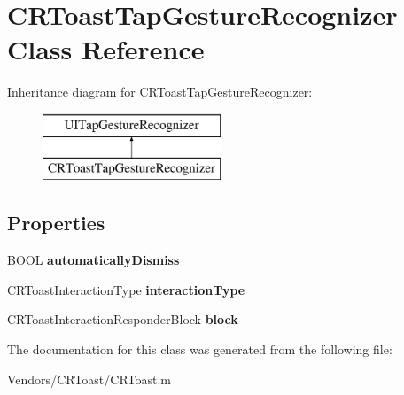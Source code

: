 \hypertarget{interface_c_r_toast_tap_gesture_recognizer}{}\section{C\+R\+Toast\+Tap\+Gesture\+Recognizer Class Reference}
\label{interface_c_r_toast_tap_gesture_recognizer}
Inheritance diagram for C\+R\+Toast\+Tap\+Gesture\+Recognizer\+:\begin{figure}[H]
\begin{center}
\leavevmode
\includegraphics[height=2.000000cm]{interface_c_r_toast_tap_gesture_recognizer}
\end{center}
\end{figure}
\subsection*{Properties}
\begin{DoxyCompactItemize}
\item 
\hypertarget{interface_c_r_toast_tap_gesture_recognizer_afbacb646c8b45529dfe359044ee67fc6}{}B\+O\+O\+L {\bfseries automatically\+Dismiss}\label{interface_c_r_toast_tap_gesture_recognizer_afbacb646c8b45529dfe359044ee67fc6}

\item 
\hypertarget{interface_c_r_toast_tap_gesture_recognizer_a636ad21064ff18009ed1511e0e24178e}{}C\+R\+Toast\+Interaction\+Type {\bfseries interaction\+Type}\label{interface_c_r_toast_tap_gesture_recognizer_a636ad21064ff18009ed1511e0e24178e}

\item 
\hypertarget{interface_c_r_toast_tap_gesture_recognizer_a3cfbd94cd48b165649c0abff35ed71a5}{}C\+R\+Toast\+Interaction\+Responder\+Block {\bfseries block}\label{interface_c_r_toast_tap_gesture_recognizer_a3cfbd94cd48b165649c0abff35ed71a5}

\end{DoxyCompactItemize}


The documentation for this class was generated from the following file\+:\begin{DoxyCompactItemize}
\item 
Vendors/\+C\+R\+Toast/C\+R\+Toast.\+m\end{DoxyCompactItemize}

